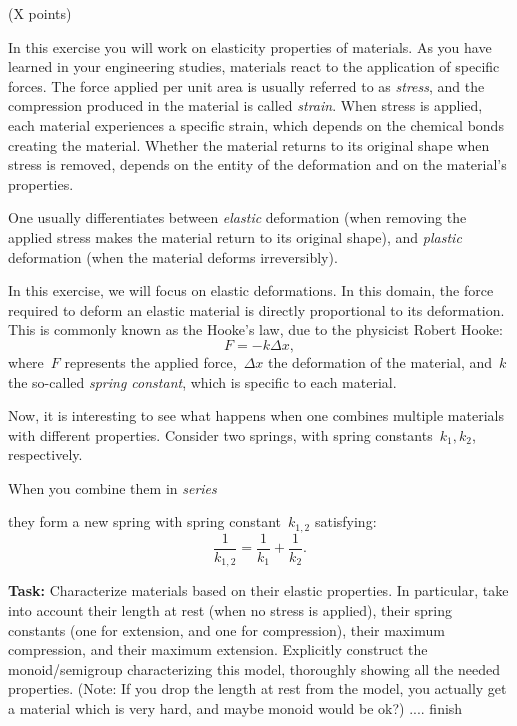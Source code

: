 \documentclass[paper=8.125in:10.250in,pagesize=pdftex,
    headinclude=false,footinclude=false,oneside,egregdoesnotlikesansseriftitles]{kaobook}
\begin{document}
\begin{gradedexercise} (X points)

    In this exercise you will work on elasticity properties of materials.
    As you have learned in your engineering studies, materials react to the application of specific forces.
    The force applied per unit area is usually referred to as \emph{stress}, and the compression produced in the material is called \emph{strain}.
    When stress is applied, each material experiences a specific strain, which depends on the chemical bonds creating the material.
    Whether the material returns to its original shape when stress is removed, depends on the entity of the deformation and on the material's properties.

    One usually differentiates between \emph{elastic} deformation (when removing the applied stress makes the material return to its original shape), and \emph{plastic} deformation (when the material deforms irreversibly).

    In this exercise, we will focus on elastic deformations. In this domain, the force required to deform an elastic material is directly proportional to its deformation.
    This is commonly known as the Hooke's law, due to the physicist Robert Hooke:
    \begin{equation*}
        F=-k\Delta x,
    \end{equation*}
    where~$F$ represents the applied force,~$\Delta x$ the deformation of the material, and~$k$ the so-called \emph{spring constant}, which is specific to each material.

    Now, it is interesting to see what happens when one combines multiple materials with different properties.
    Consider two springs, with spring constants~$k_1,k_2$, respectively.


    When you combine them in \emph{series}

     \begin{center}
        \end{center}
    they form a new spring with spring constant~$k_{1,2}$ satisfying:
    \begin{equation*}
        \frac{1}{k_{1,2}}=\frac{1}{k_1}+\frac{1}{k_2}.
    \end{equation*}

    \textbf{Task:} Characterize materials based on their elastic properties. In particular, take into account their length at rest (when no stress is applied), their spring constants (one for extension, and one for compression), their maximum compression, and their maximum extension.
    Explicitly construct the monoid/semigroup characterizing this model, thoroughly showing all the needed properties.
    (Note: If you drop the length at rest from the model, you actually get a material which is very hard, and maybe monoid would be ok?)
    .... finish
\end{gradedexercise}

\end{document}
